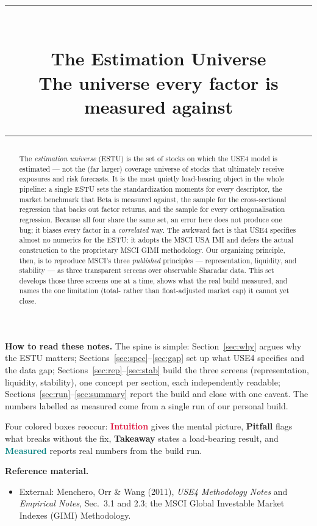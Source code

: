 \documentclass[11pt]{article}
\title{\vspace{-2.2em}
  {\color{steel}\rule{\textwidth}{1.3pt}}\\[0.7em]
  \Huge\bfseries The Estimation Universe\\[0.35em]
  \large\mdseries The universe every factor is measured against\\[0.4em]
  {\color{steel}\rule{\textwidth}{0.7pt}}}
\author{}
\date{}
\theoremstyle{definition}
\theoremstyle{plain}
\theoremstyle{remark}
\begin{document}
\maketitle
\thispagestyle{empty}

\begin{abstract}
The \emph{estimation universe} (ESTU) is the set of stocks on which the USE4 model is estimated --- not the (far larger) coverage universe of stocks that ultimately receive exposures and risk forecasts. It is the most quietly load-bearing object in the whole pipeline: a single ESTU sets the standardization moments for every descriptor, the market benchmark that Beta is measured against, the sample for the cross-sectional regression that backs out factor returns, and the sample for every orthogonalisation regression. Because all four share the same set, an error here does not produce one bug; it biases every factor in a \emph{correlated} way. The awkward fact is that USE4 specifies almost no numerics for the ESTU: it adopts the MSCI USA IMI and defers the actual construction to the proprietary MSCI GIMI methodology. Our organizing principle, then, is to reproduce MSCI's three \emph{published} principles --- representation, liquidity, and stability --- as three transparent screens over observable Sharadar data. This set develops those three screens one at a time, shows what the real build measured, and names the one limitation (total- rather than float-adjusted market cap) it cannot yet close.
\end{abstract}

\begin{tcolorbox}[colback=paperlt,colframe=ink!30,boxrule=0.4pt,arc=2pt,left=10pt,right=10pt,top=8pt,bottom=8pt]
\textbf{How to read these notes.} The spine is simple: Section~\ref{sec:why} argues why the ESTU matters; Sections~\ref{sec:spec}--\ref{sec:gap} set up what USE4 specifies and the data gap; Sections~\ref{sec:rep}--\ref{sec:stab} build the three screens (representation, liquidity, stability), one concept per section, each independently readable; Sections~\ref{sec:run}--\ref{sec:summary} report the build and close with one caveat. The numbers labelled as measured come from a single run of our personal build.

Four colored boxes reoccur: \textcolor{crimson}{\textbf{Intuition}} gives the mental picture, \textcolor{amber}{\textbf{Pitfall}} flags what breaks without the fix, \textcolor{steel}{\textbf{Takeaway}} states a load-bearing result, and \textcolor{teal}{\textbf{Measured}} reports real numbers from the build run.

\textbf{Reference material.}
\begin{itemize}[leftmargin=1.4em,topsep=2pt]
  \item External: Menchero, Orr \& Wang (2011), \emph{USE4 Methodology Notes} and \emph{Empirical Notes}, Sec.\ 3.1 and 2.3; the MSCI Global Investable Market Indexes (GIMI) Methodology.
\end{itemize}
\end{tcolorbox}
\end{document}

